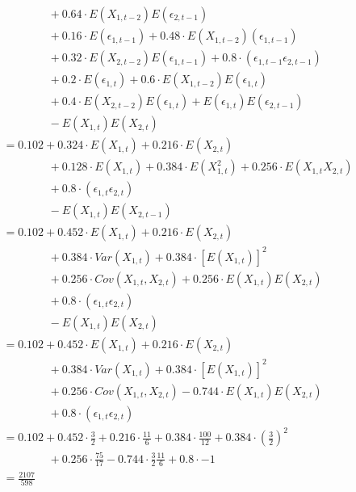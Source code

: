 \begin{solution}
\begin{equation}
\begin{aligned}
						& \qquad \qquad + 0.64 \cdot E(X_{1,t-2})E(\epsilon_{2,t-1}) \\
						& \qquad \qquad + 0.16 \cdot E(\epsilon_{1,t-1}) + 0.48 \cdot E(X_{1,t-2})(\epsilon_{1,t-1}) \\
						& \qquad \qquad + 0.32 \cdot E(X_{2,t-2})E(\epsilon_{1,t-1}) + 0.8 \cdot (\epsilon_{1,t-1}\epsilon_{2,t-1}) \\
						& \qquad \qquad + 0.2 \cdot E(\epsilon_{1,t}) + 0.6 \cdot E(X_{1,t-2})E(\epsilon_{1,t}) \\
						& \qquad \qquad + 0.4 \cdot E(X_{2,t-2})E(\epsilon_{1,t}) + E(\epsilon_{1,t})E(\epsilon_{2,t-1}) \\
						& \qquad \qquad - E(X_{1,t})E(X_{2,t}) \\
													& = 0.102 + 0.324 \cdot E(X_{1,t}) + 0.216 \cdot E(X_{2,t})\\
						& \qquad \qquad + 0.128 \cdot E(X_{1,t}) + 0.384 \cdot E(X_{1,t}^2) + 0.256 \cdot E(X_{1,t}X_{2,t}) \\
						& \qquad \qquad + 0.8 \cdot (\epsilon_{1,t}\epsilon_{2,t})\\
						& \qquad \qquad - E(X_{1,t})E(X_{2,t-1}) \\
													& = 0.102 + 0.452 \cdot E(X_{1,t}) + 0.216 \cdot E(X_{2,t})\\
						& \qquad \qquad + 0.384 \cdot Var(X_{1,t}) + 0.384 \cdot \left[E(X_{1,t})\right]^2 \\
						& \qquad \qquad + 0.256 \cdot Cov(X_{1,t}, X_{2,t}) + 0.256 \cdot E(X_{1,t})E(X_{2,t})\\
						& \qquad \qquad + 0.8 \cdot (\epsilon_{1,t}\epsilon_{2,t})\\
						& \qquad \qquad - E(X_{1,t})E(X_{2,t}) \\
													& = 0.102 + 0.452 \cdot E(X_{1,t}) + 0.216 \cdot E(X_{2,t})\\
						& \qquad \qquad + 0.384 \cdot Var(X_{1,t}) + 0.384 \cdot \left[E(X_{1,t})\right]^2 \\
						& \qquad \qquad + 0.256 \cdot Cov(X_{1,t}, X_{2,t}) - 0.744 \cdot E(X_{1,t})E(X_{2,t})\\
						& \qquad \qquad + 0.8 \cdot (\epsilon_{1,t}\epsilon_{2,t})\\
													& = 0.102 + 0.452 \cdot \frac{3}{2} + 0.216 \cdot \frac{11}{6}
														+ 0.384 \cdot \frac{100}{12}+ 0.384 \cdot \left(\frac{3}{2}\right)^2 \\
						& \qquad \qquad + 0.256 \cdot \frac{75}{17} - 0.744 \cdot \frac{3}{2}\frac{11}{6}
														+ 0.8 \cdot -1\\
													& = \frac{2107}{598}
\end{aligned}
\end{equation}


\end{solution}
